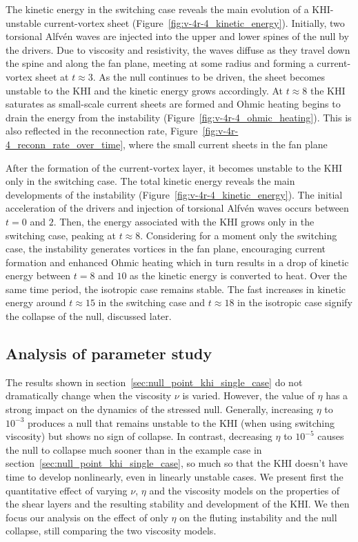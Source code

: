 
The kinetic energy in the switching case reveals the main evolution of a KHI-unstable current-vortex sheet (Figure~\ref{fig:v-4r-4_kinetic_energy}). Initially, two torsional Alfv\'en waves are injected into the upper and lower spines of the null by the drivers. Due to viscosity and resistivity, the waves diffuse as they travel down the spine and along the fan plane, meeting at some radius and forming a current-vortex sheet at $t\approx3$. As the null continues to be driven, the sheet becomes unstable to the KHI and the kinetic energy grows accordingly. At $t\approx 8$ the KHI saturates as small-scale current sheets are formed and Ohmic heating begins to drain the energy from the instability (Figure~\ref{fig:v-4r-4_ohmic_heating}). This is also reflected in the reconnection rate, Figure~\ref{fig:v-4r-4_reconn_rate_over_time}, where the small current sheets in the fan plane 

After the formation of the current-vortex layer, it becomes unstable to the KHI only in the switching case. The total kinetic energy reveals the main developments of the instability (Figure~\ref{fig:v-4r-4_kinetic_energy}). The initial acceleration of the drivers and injection of torsional Alfv\'en waves occurs between $t=0$ and $2$. Then, the energy associated with the KHI grows only in the switching case, peaking at $t\approx 8$. Considering for a moment only the switching case, the instability generates vortices in the fan plane, encouraging current formation and enhanced Ohmic heating which in turn results in a drop of kinetic energy between $t=8$ and $10$ as the kinetic energy is converted to heat. Over the same time period, the isotropic case remains stable. The fast increases in kinetic energy around $t\approx 15$ in the switching case and $t\approx 18$ in the isotropic case signify the collapse of the null, discussed later.

\subsection{Analysis of parameter study}

The results shown in section~\ref{sec:null_point_khi_single_case} do not dramatically change when the viscosity $\nu$ is varied. However, the value of $\eta$ has a strong impact on the dynamics of the stressed null. Generally, increasing $\eta$ to $10^{-3}$ produces a null that remains unstable to the KHI (when using switching viscosity) but shows no sign of collapse. In contrast, decreasing $\eta$ to $10^{-5}$ causes the null to collapse much sooner than in the example case in section~\ref{sec:null_point_khi_single_case}, so much so that the KHI doesn't have time to develop nonlinearly, even in linearly unstable cases. We present first the quantitative effect of varying $\nu$, $\eta$ and the viscosity models on the properties of the shear layers and the resulting stability and development of the KHI. We then focus our analysis on the effect of only $\eta$ on the fluting instability and the null collapse, still comparing the two viscosity models.

